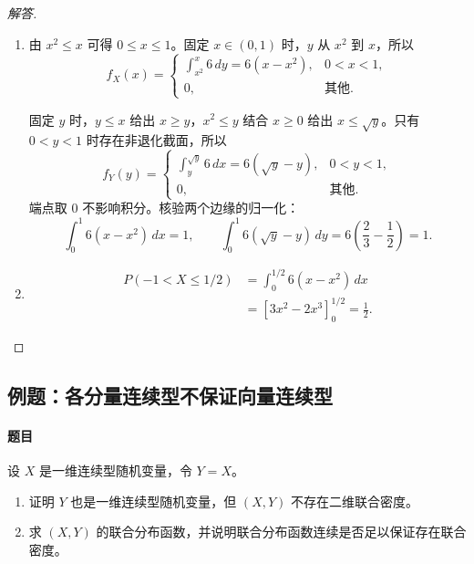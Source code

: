\begin{proof}[解答]
\begin{enumerate}
\item 由 $x^2\leq x$ 可得 $0\leq x\leq1$。固定 $x\in(0,1)$ 时，$y$ 从 $x^2$ 到 $x$，所以
\[
f_X(x)=
\begin{cases}
\displaystyle\int_{x^2}^x6\,dy=6(x-x^2),&0<x<1,\\
0,&\text{其他}.
\end{cases}
\]


固定 $y$ 时，$y\leq x$ 给出 $x\geq y$，$x^2\leq y$ 结合 $x\geq0$ 给出 $x\leq\sqrt y$。只有 $0<y<1$ 时存在非退化截面，所以
\[
f_Y(y)=
\begin{cases}
\displaystyle\int_y^{\sqrt y}6\,dx=6(\sqrt y-y),&0<y<1,\\
0,&\text{其他}.
\end{cases}
\]
端点取 $0$ 不影响积分。核验两个边缘的归一化：
\[
\int_0^1 6(x-x^2)\,dx=1,\qquad
\int_0^1 6(\sqrt y-y)\,dy=6\left(\frac23-\frac12\right)=1.
\]

\item \begin{align*}
P(-1<X\leq1/2)
&=\int_0^{1/2}6(x-x^2)\,dx\\
&=[3x^2-2x^3]_0^{1/2}=\frac12.
\end{align*}
\end{enumerate}
\end{proof}

\subsection{例题：各分量连续型不保证向量连续型}\label{note:c3:e6}
\paragraph{题目}
设 $X$ 是一维连续型随机变量，令 $Y=X$。
\begin{enumerate}
\item 证明 $Y$ 也是一维连续型随机变量，但 $(X,Y)$ 不存在二维联合密度。

\item 求 $(X,Y)$ 的联合分布函数，并说明联合分布函数连续是否足以保证存在联合密度。
\end{enumerate}

